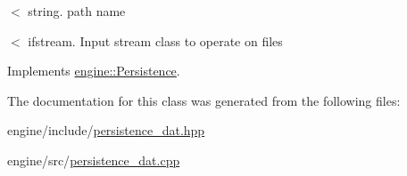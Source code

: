 $<$ string. path name

$<$ ifstream. Input stream class to operate on files 

Implements \hyperlink{classengine_1_1_persistence}{engine\+::\+Persistence}.



The documentation for this class was generated from the following files\+:\begin{DoxyCompactItemize}
\item 
engine/include/\hyperlink{persistence__dat_8hpp}{persistence\+\_\+dat.\+hpp}\item 
engine/src/\hyperlink{persistence__dat_8cpp}{persistence\+\_\+dat.\+cpp}\end{DoxyCompactItemize}
